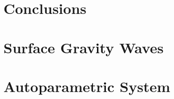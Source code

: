 \documentclass[letterpaper,tocnosub,noragright,centerchapter,12pt,edeposit]{uiucecethesis09}
\begin{document}
\chapter{Conclusions}
\label{c:conclusions}


\appendix
\chapter{Surface Gravity Waves}



\chapter{Autoparametric System}




\backmatter




\aubio

\end{document}
